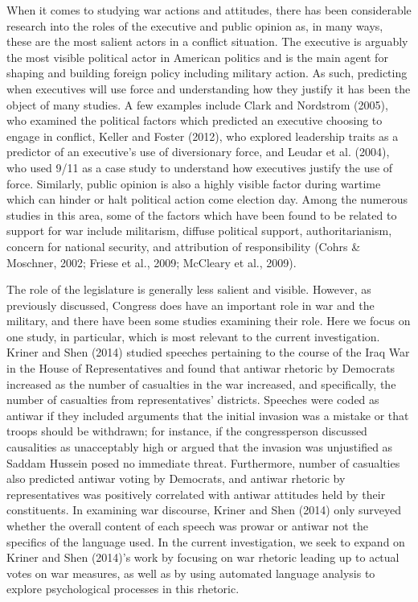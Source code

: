 \documentclass[english,man]{apa6}
\theoremstyle{definition}
\theoremstyle{definition}
\theoremstyle{definition}
\theoremstyle{remark}
\begin{document}
When it comes to studying war actions and attitudes, there has been
considerable research into the roles of the executive and public opinion
as, in many ways, these are the most salient actors in a conflict
situation. The executive is arguably the most visible political actor in
American politics and is the main agent for shaping and building foreign
policy including military action. As such, predicting when executives
will use force and understanding how they justify it has been the object
of many studies. A few examples include Clark and Nordstrom (2005), who
examined the political factors which predicted an executive choosing to
engage in conflict, Keller and Foster (2012), who explored leadership
traits as a predictor of an executive's use of diversionary force, and
Leudar et al. (2004), who used 9/11 as a case study to understand how
executives justify the use of force. Similarly, public opinion is also a
highly visible factor during wartime which can hinder or halt political
action come election day. Among the numerous studies in this area, some
of the factors which have been found to be related to support for war
include militarism, diffuse political support, authoritarianism, concern
for national security, and attribution of responsibility (Cohrs \&
Moschner, 2002; Friese et al., 2009; McCleary et al., 2009).

The role of the legislature is generally less salient and visible.
However, as previously discussed, Congress does have an important role
in war and the military, and there have been some studies examining
their role. Here we focus on one study, in particular, which is most
relevant to the current investigation. Kriner and Shen (2014) studied
speeches pertaining to the course of the Iraq War in the House of
Representatives and found that antiwar rhetoric by Democrats increased
as the number of casualties in the war increased, and specifically, the
number of casualties from representatives' districts. Speeches were
coded as antiwar if they included arguments that the initial invasion
was a mistake or that troops should be withdrawn; for instance, if the
congressperson discussed causalities as unacceptably high or argued that
the invasion was unjustified as Saddam Hussein posed no immediate
threat. Furthermore, number of casualties also predicted antiwar voting
by Democrats, and antiwar rhetoric by representatives was positively
correlated with antiwar attitudes held by their constituents. In
examining war discourse, Kriner and Shen (2014) only surveyed whether
the overall content of each speech was prowar or antiwar not the
specifics of the language used. In the current investigation, we seek to
expand on Kriner and Shen (2014)'s work by focusing on war rhetoric
leading up to actual votes on war measures, as well as by using
automated language analysis to explore psychological processes in this
rhetoric.
\end{document}
